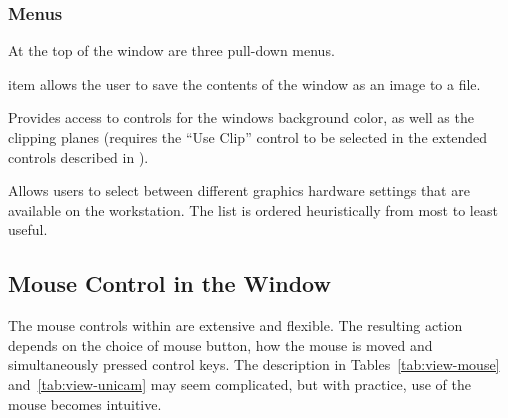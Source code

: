 \subsubsection{Menus}

At the top of the \viewer{} window are three pull-down menus.

\begin{description}
    item allows the user to save the contents of the
  \viewer{} window as an image to a file.
  
   Provides access to controls for the windows 
  background color, as well as the clipping planes
  (requires the ``Use Clip'' control to be selected in the extended
  controls described in ).
  
   Allows users to select between different
  graphics hardware settings that are available on the workstation.
  The list is ordered heuristically from most to least useful.
\end{description}

\subsection{Mouse Control in the \viewer{} Window}
\label{sec:view-mouse} 

The mouse controls within \SR{} are extensive and flexible.  The
resulting action depends on the choice of mouse button, how the mouse is moved
and simultaneously pressed control keys.  The
description in Tables~\ref{tab:view-mouse} and~\ref{tab:view-unicam}
may seem complicated, but with practice, use of the mouse becomes intuitive.


